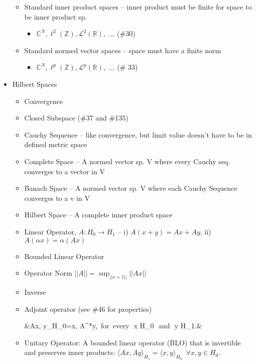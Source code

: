 \documentclass{article}
\begin{document}
\begin{itemize}
	\begin{itemize}
	\item Standard inner product spaces -- {\color{gray} inner product must be finite for space to be inner product sp.}
		\begin{itemize}
		\item $\mathbb{C}^N, \ell^2(\mathbb{Z}), \mathcal{L}^2(\mathbb{R}),$ ... (\#30)
		\end{itemize}
	\item Standard normed vector spaces -- {\color{gray} space must have a finite norm}
		\begin{itemize}
			\item $\mathbb{C}^N, \ell^p(\mathbb{Z}), \mathcal{L}^p(\mathbb{R}),$ ... (\# 33)
 		\end{itemize}
	\end{itemize}
\item Hilbert Spaces
	\begin{itemize}
	\item Convergence
	\item Closed Subspace (\#37 and \#135)
	\item Cauchy Sequence -- {like convergence, but limit value doesn't have to be in defined metric space}
	\item Complete Space -- {\color{gray} A normed vector sp. V where every Cauchy seq. converges to a vector in V}
	\item Banach Space -- {\color{gray} A normed vector sp. V where each Cauchy Sequence converges to a v in V}
	\item Hilbert Space -- {\color{gray} A complete inner product space}
	\item Linear Operator, $A: H_0 \rightarrow H_1$ -- {i) $A(x+y) = Ax+Ay$, ii) $A(\alpha x)=\alpha(Ax)$ }
	\item Bounded Linear Operator
	\item Operator Norm {\color{gray} $||A|| = \sup_{||x=1||}||Ax||$}
	\item Inverse
	\item Adjoint operator (see \#46 for properties)	\begin{flalign}
	&\langle Ax, y\rangle_{H_0}=\langle x, A^{*}y\rangle,\, \mbox{for every}\,\, x \in H_0 \,\,\mbox{and}\,\, y \in H_1.&
	\end{flalign}
	\item Unitary Operator: A bounded linear operator (BLO) that is invertible and preserves inner products: $\langle Ax,Ay\rangle_{H_1} = \langle x,y \rangle_{H_0}\,\,\,\forall
	x,y \in H_0$.  \\

\end{itemize}
\end{itemize}
\end{document}
